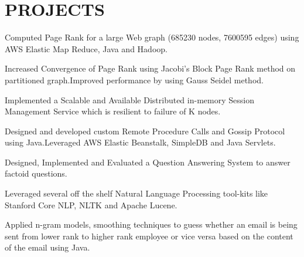 \documentclass[]{deedy-resume-openfont}
\begin{document}
\begin{minipage}[t]{0.66\textwidth} 


\section{PROJECTS}

\vspace{\topsep} %
\begin{tightemize}
\item Computed Page Rank for a large Web graph (685230 nodes, 7600595 edges) using AWS Elastic Map Reduce, Java and Hadoop.
\item Increased Convergence of Page Rank using Jacobi's Block Page Rank method on partitioned graph.Improved performance by using Gauss Seidel method.
\end{tightemize}
\sectionsep

\begin{tightemize}
\item Implemented a Scalable and Available Distributed in-memory Session Management Service which is resilient to failure of K nodes.
\item Designed and developed custom Remote Procedure Calls and Gossip Protocol using Java.Leveraged AWS Elastic Beanstalk, SimpleDB and Java Servlets.
\end{tightemize}
\sectionsep

\begin{tightemize}
\item Designed, Implemented and Evaluated a Question Answering System to answer factoid questions. 
\item Leveraged several off the shelf Natural Language Processing tool-kits like Stanford Core NLP, NLTK and Apache Lucene.
\end{tightemize}
\sectionsep

\begin{tightemize}
\item Applied n-gram models, smoothing techniques  to guess whether an email is being sent from lower rank to higher rank employee or vice versa based on the content of the email using Java.
\end{tightemize}
\sectionsep


\end{minipage}
\end{document}
